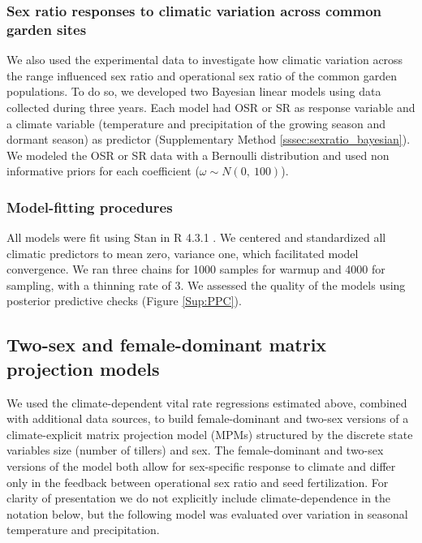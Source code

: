 \documentclass[12pt]{article}\usepackage[]{graphicx}\usepackage[dvipsnames]{xcolor}
\begin{document}
\subsubsection*{Sex ratio responses to climatic variation across common garden sites}
We also used the experimental data to investigate how climatic variation across the range influenced sex ratio and operational sex ratio of the common garden populations. 
To do so, we developed  two Bayesian linear models using  data collected during three years.
Each model had OSR or SR as response variable and a climate variable (temperature and precipitation of the growing season and dormant season) as predictor (Supplementary Method \ref{sssec:sexratio_bayesian}). 
We modeled the OSR or SR data with a Bernoulli distribution and used non informative priors for each coefficient ($\omega \sim N(0,\ 100)$). 

\subsubsection*{Model-fitting procedures}
All models were fit using Stan \citep{rstan} in R 4.3.1 \citep{RCoreteam}.
We centered and standardized all climatic predictors to mean zero, variance one, which facilitated model convergence.
We ran three chains for 1000 samples for warmup and 4000 for sampling, with a thinning rate of 3.
We assessed the quality of the models using posterior predictive checks \citep{piironen2017comparison} (Figure \ref{Sup:PPC}).
 
\subsection*{Two-sex and female-dominant matrix projection models}
We used the climate-dependent vital rate regressions estimated above, combined with additional data sources, to build female-dominant and two-sex versions of a climate-explicit matrix projection model (MPMs) structured by the discrete state variables size (number of tillers) and sex.
The female-dominant and two-sex versions of the model both allow for sex-specific response to climate and differ only in the feedback between operational sex ratio and seed fertilization. 
For clarity of presentation we do not explicitly include climate-dependence in the notation below, but the following model was evaluated over variation in seasonal temperature and precipitation. 
\end{document}
